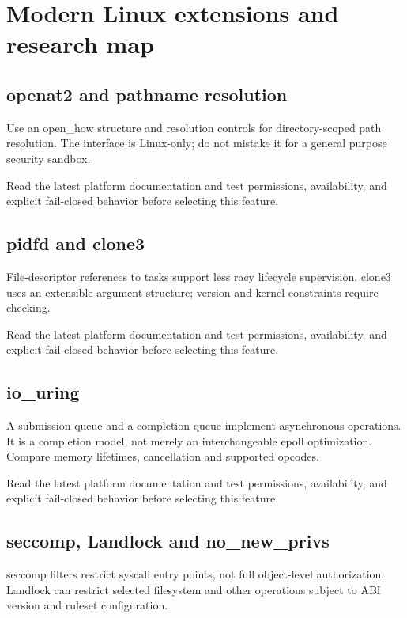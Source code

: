 \documentclass[11pt,letterpaper,oneside]{report}
\begin{document}
\chapter{Modern Linux extensions and research map}
\section{openat2 and pathname resolution}
Use an open\_how structure and resolution controls for directory-scoped path resolution. The interface is Linux-only; do not mistake it for a general purpose security sandbox.

\begin{modernnote}
Read the latest platform documentation and test permissions, availability, and explicit fail-closed behavior before selecting this feature.
\end{modernnote}
\section{pidfd and clone3}
File-descriptor references to tasks support less racy lifecycle supervision. clone3 uses an extensible argument structure; version and kernel constraints require checking.

\begin{modernnote}
Read the latest platform documentation and test permissions, availability, and explicit fail-closed behavior before selecting this feature.
\end{modernnote}
\section{io\_uring}
A submission queue and a completion queue implement asynchronous operations. It is a completion model, not merely an interchangeable epoll optimization. Compare memory lifetimes, cancellation and supported opcodes.

\begin{modernnote}
Read the latest platform documentation and test permissions, availability, and explicit fail-closed behavior before selecting this feature.
\end{modernnote}
\section{seccomp, Landlock and no\_new\_privs}
seccomp filters restrict syscall entry points, not full object-level authorization. Landlock can restrict selected filesystem and other operations subject to ABI version and ruleset configuration.
\end{document}
